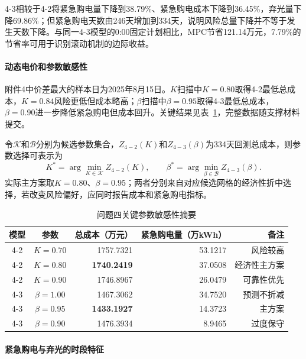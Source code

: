 \documentclass{cumcmthesis}
\begin{document}
4-3相较于4-2将紧急购电量下降到38.79\%、紧急购电成本下降到36.45\%，弃光量下降69.86\%；但紧急购电天数由246天增加到334天，说明风险总量下降并不等于发生天数下降。与同一4-3模型的0:00固定计划相比，MPC节省121.14万元，7.79\%的节省率可用于识别滚动机制的边际收益。

\paragraph{动态电价和参数敏感性}

附件4中价差最大的样本日为2025年8月15日。$K$扫描中$K=0.80$取得4-2最低总成本，$K=0.84$风险更低但成本略高；$\beta$扫描中$\beta=0.95$取得4-3最低总成本，$\beta=0.90$进一步降低紧急购电但成本回升。关键结果见表~\ref{tab:q4sens}，完整数据随支撑材料提交。

令$\mathcal K$和$\mathcal B$分别为候选参数集合，$Z_{4-2}(K)$和$Z_{4-3}(\beta)$为334天回测总成本，则参数选择可表示为
\begin{equation}
K^*=\arg\min_{K\in\mathcal K}Z_{4-2}(K),\qquad
\beta^*=\arg\min_{\beta\in\mathcal B}Z_{4-3}(\beta).
\tag{27a}
\end{equation}
实际主方案取$K=0.80$、$\beta=0.95$；两者分别来自对应候选网格的经济性折中选择，若改变风险偏好，应同时报告成本和紧急购电指标。

\begin{table}[H]
\centering
\renewcommand\arraystretch{1.2}
\caption{问题四关键参数敏感性摘要}
\label{tab:q4sens}
\begin{tabular}{ccrrr}
\toprule
\textbf{模型} & \textbf{参数} & \textbf{总成本（万元）} & \textbf{紧急购电量（万kWh）} & \textbf{备注}\\
\midrule
4-2 & $K=0.70$ & 1757.7321 & 53.1217 & 风险较高\\
4-2 & $K=0.80$ & \textbf{1740.2419} & 37.0508 & 经济性主方案\\
4-2 & $K=0.90$ & 1746.8967 & 26.0479 & 可靠性优先\\
4-3 & $\beta=1.00$ & 1467.3062 & 34.7520 & 预测不折减\\
4-3 & $\beta=0.95$ & \textbf{1433.1927} & 14.3723 & 主方案\\
4-3 & $\beta=0.90$ & 1476.3934 & 8.9465 & 过度保守\\
\bottomrule
\end{tabular}
\end{table}

\paragraph{紧急购电与弃光的时段特征}
\end{document}
